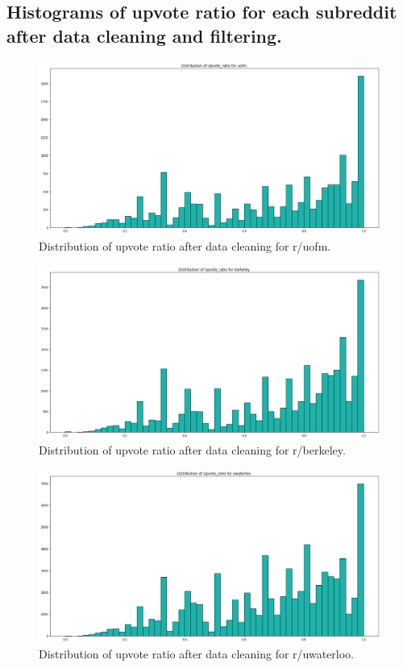 \documentclass[11pt,a4paper]{article}
\let\Oldsubsection\subsection
\renewcommand{\subsection}{\FloatBarrier\Oldsubsection}
\begin{document}
    \subsection{Histograms of upvote ratio for each subreddit after data cleaning and filtering.}
    \begin{figure}
        \includegraphics[width=\textwidth]{uofm_ratio1.png}
        \caption{Distribution of upvote ratio after data cleaning for r/uofm.}
    \end{figure}
    \begin{figure}
        \includegraphics[width=\textwidth]{berkeley_ratio1.png}
        \caption{Distribution of upvote ratio after data cleaning for r/berkeley.}
    \end{figure}
    \begin{figure}
        \includegraphics[width=\textwidth]{uwaterloo_ratio1.png}
        \caption{Distribution of upvote ratio after data cleaning for r/uwaterloo.}
    \end{figure}
\end{document}
